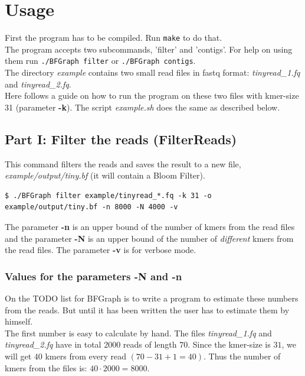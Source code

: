 \documentclass[a4paper]{report}
\renewcommand{\b}[1]{\textbf{#1}}  %
\newcommand{\e}[1]{\emph{#1}}    %
\begin{document}
\chapter{Usage}
First the program has to be compiled. Run {\verb `make` } to do that.\\[4pt]

The program accepts two subcommands, 'filter' and 'contigs'. 
For help on using them run {\verb `./BFGraph filter`} or {\verb `./BFGraph contigs`}.\\[4pt] 

The directory \e{example} contains two small  read files in fastq format: 
\e{tinyread\_1.fq} and \e{tinyread\_2.fq}.\\[4pt]

Here follows a guide on how to run the program on these two files with kmer-size 31 (parameter \b{-k}).
The script \e{example.sh} does the same as described below.

\section{Part I: Filter the reads (FilterReads)}
This command filters the reads and saves the result to a new file, \e{example/output/tiny.bf} (it will contain a Bloom Filter).
\begin{verbatim}
$ ./BFGraph filter example/tinyread_*.fq -k 31 -o example/output/tiny.bf -n 8000 -N 4000 -v
\end{verbatim}

The parameter \b{-n} is an upper bound of the number of kmers from the read files and the parameter \b{-N} is an upper bound
of the number of \textit{different} kmers from the read files. The parameter \b{-v} is for verbose mode.\\[4pt]

\subsection{Values for the parameters \b{-N} and \b{-n}}  %
On the TODO list for BFGraph is to write a program to estimate these numbers from the reads. But until it has been written the user has to estimate
them by himself. \\[4pt]

The first number is easy to calculate by hand. The files \e{tinyread\_1.fq} and \e{tinyread\_2.fq} have in total 2000 reads of length $70$.
Since the kmer-size is $31$, we will get $40$ kmers from every read $(70 - 31 + 1=40)$. Thus the number of kmers from the files
is: $40\cdot 2000=8000$. \\[4pt]
\end{document}

